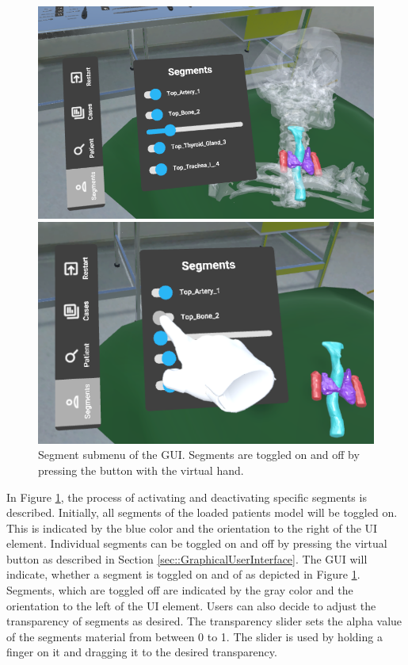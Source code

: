 \begin{figure}[ht]
  \centering
  \begin{minipage}{.5\textwidth}
    \centering
    \includegraphics[width=0.95\linewidth]{images/implementation/features/visualization/segments_1.png}
  \end{minipage}%
  \begin{minipage}{.5\textwidth}
    \centering
    \includegraphics[width=0.915\linewidth]{images/implementation/features/visualization/segments_2.png}
  \end{minipage}
  \caption{\label{fig::Segmentation}Segment submenu of the GUI. Segments are toggled on and off by pressing the button with the virtual hand.}
\end{figure}

In Figure \ref{fig::Segmentation}, the process of activating and deactivating specific segments is described.
Initially, all segments of the loaded patients model will be toggled on.
This is indicated by the blue color and the orientation to the right of the UI element.
Individual segments can be toggled on and off by pressing the virtual button as described in Section \ref{sec::GraphicalUserInterface}.
The GUI will indicate, whether a segment is toggled on and of as depicted in Figure \ref{fig::Segmentation}.
Segments, which are toggled off are indicated by the gray color and the orientation to the left of the UI element.
Users can also decide to adjust the transparency of segments as desired.
The transparency slider sets the alpha value of the segments material from between 0 to 1.
The slider is used by holding a finger on it and dragging it to the desired transparency.


